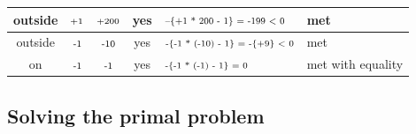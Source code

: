 \begin{frame}
\begin{table}[h]
\begin{tabular}{ccccll}
\\ \hline
outside  & $\mbox{\scriptsize+1}$                                                   & $\mbox{\scriptsize+200}$                                                        & yes                                                            & $\mbox{\scriptsize--\{+1 * 200 - 1\} = -199 < 0}$                & {\color[HTML]{DF02F8} met}
\\ \hline
outside  & $\mbox{\scriptsize-1}$                               & $\mbox{\scriptsize-10}$                                                         & yes                                                            & $\mbox{\scriptsize-\{-1 * (-10) - 1\} = -\{+9\} < 0}$               & {\color[HTML]{DF02F8} met}
\\ \hline
on       & $\mbox{\scriptsize-1}$                                & $\mbox{\scriptsize-1}$                                                         & yes                                                            & $\mbox{\scriptsize-\{-1 * (-1) - 1\} = 0}$                              & {\color[HTML]{CB0000} met with equality}
\end{tabular}
\end{table}
\end{frame}

\subsection{Solving the primal problem}


